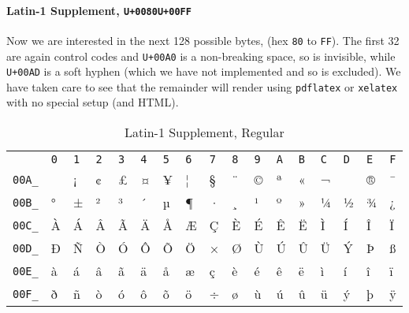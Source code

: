 \documentclass[10pt,]{article}
\theoremstyle{plain}
\theoremstyle{definition}
\theoremstyle{definition}
\theoremstyle{definition}
\theoremstyle{definition}
\theoremstyle{definition}
\theoremstyle{definition}
\numberwithin{equation}{section}
\begin{document}
\paragraph[{Latin-1 Supplement, \texttt{U+0080}\textendash{}\texttt{U+00FF}}]{Latin-1 Supplement, \texttt{U+0080}\textendash{}\texttt{U+00FF}}\hypertarget{paragraphs-8}{}
\hypertarget{p-603}{}%
Now we are interested in the next 128 possible bytes,  (hex \lstinline?80? to \lstinline?FF?).  The first 32 are again control codes and \lstinline?U+00A0? is a non-breaking space, so is invisible, while \lstinline?U+00AD? is a soft hyphen (which we have not implemented and so is excluded).  We have taken care to see that the remainder will render using \lstinline?pdflatex? or \lstinline?xelatex? with no special setup (and HTML).%
\begin{table}
\centering
\begin{tabular}{lllllllllllllllll}
&\lstinline?0?&\lstinline?1?&\lstinline?2?&\lstinline?3?&\lstinline?4?&\lstinline?5?&\lstinline?6?&\lstinline?7?&\lstinline?8?&\lstinline?9?&\lstinline?A?&\lstinline?B?&\lstinline?C?&\lstinline?D?&\lstinline?E?&\lstinline?F?\tabularnewline[0pt]
\lstinline?00A_?&~&¡&¢&£&¤&¥&¦&§&¨&©&ª&«&¬&&®&¯\tabularnewline[0pt]
\lstinline?00B_?&°&±&²&³&´&µ&¶&·&¸&¹&º&»&¼&½&¾&¿\tabularnewline[0pt]
\lstinline?00C_?&À&Á&Â&Ã&Ä&Å&Æ&Ç&È&É&Ê&Ë&Ì&Í&Î&Ï\tabularnewline[0pt]
\lstinline?00D_?&Ð&Ñ&Ò&Ó&Ô&Õ&Ö&×&Ø&Ù&Ú&Û&Ü&Ý&Þ&ß\tabularnewline[0pt]
\lstinline?00E_?&à&á&â&ã&ä&å&æ&ç&è&é&ê&ë&ì&í&î&ï\tabularnewline[0pt]
\lstinline?00F_?&ð&ñ&ò&ó&ô&õ&ö&÷&ø&ù&ú&û&ü&ý&þ&ÿ
\end{tabular}
\caption{Latin-1 Supplement, Regular\label{table-18}}
\end{table}
\typeout{************************************************}
\typeout{************************************************}
\end{document}
